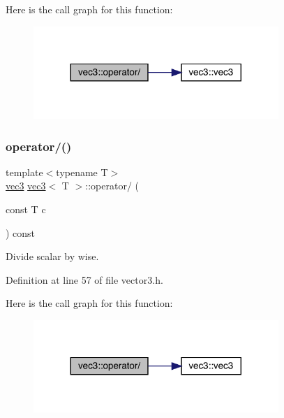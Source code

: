 Here is the call graph for this function\+:\nopagebreak
\begin{figure}[H]
\begin{center}
\leavevmode
\includegraphics[width=263pt]{structvec3_ad2f8afc304554e7b5d7331030e8bc91d_cgraph}
\end{center}
\end{figure}
\mbox{\label{structvec3_a1a47d6847627b552a0c642b356985297}} 
\subsubsection{\texorpdfstring{operator/()}{operator/()}\hspace{0.1cm}{\footnotesize\ttfamily [2/2]}}
{\footnotesize\ttfamily template$<$typename T$>$ \\
\mbox{\hyperlink{structvec3}{vec3}} \mbox{\hyperlink{structvec3}{vec3}}$<$ T $>$\+::operator/ (\begin{DoxyParamCaption}\item[{const T}]{c }\end{DoxyParamCaption}) const\hspace{0.3cm}{\ttfamily [inline]}}



Divide scalar by wise. 



Definition at line 57 of file vector3.\+h.

Here is the call graph for this function\+:\nopagebreak
\begin{figure}[H]
\begin{center}
\leavevmode
\includegraphics[width=263pt]{structvec3_a1a47d6847627b552a0c642b356985297_cgraph}
\end{center}
\end{figure}
\mbox{\label{structvec3_a4e52fc3e08391056d0e6e01a0375c395}} 
